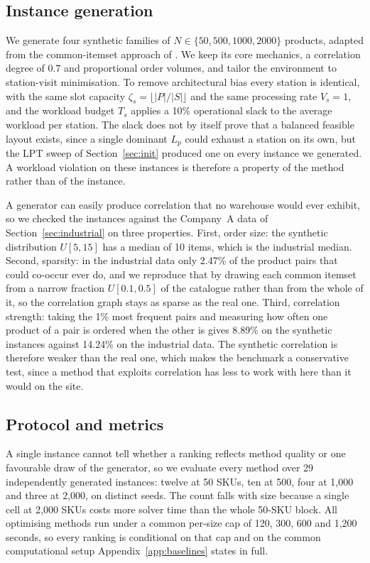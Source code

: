 \documentclass[]{interact}
\begin{document}
\subsection{Instance generation}
We generate four synthetic families of $N \in \{50, 500, 1000, 2000\}$ products, adapted from the common-itemset approach of \citet{zhang2019cie}. We keep its core mechanics, a correlation degree of $0.7$ and proportional order volumes, and tailor the environment to station-visit minimisation. To remove architectural bias every station is identical, with the same slot capacity $\zeta_s = \lfloor |P|/|S| \rfloor$ and the same processing rate $V_s = 1$, and the workload budget $T_s$ applies a 10\% operational slack to the average workload per station. The slack does not by itself prove that a balanced feasible layout exists, since a single dominant $L_p$ could exhaust a station on its own, but the LPT sweep of Section~\ref{sec:init} produced one on every instance we generated. A workload violation on these instances is therefore a property of the method rather than of the instance.

A generator can easily produce correlation that no warehouse would ever exhibit, so we checked the instances against the Company~A data of Section~\ref{sec:industrial} on three properties. First, order size: the synthetic distribution $U[5,15]$ has a median of 10 items, which is the industrial median. Second, sparsity: in the industrial data only 2.47\% of the product pairs that could co-occur ever do, and we reproduce that by drawing each common itemset from a narrow fraction $U[0.1,0.5]$ of the catalogue rather than from the whole of it, so the correlation graph stays as sparse as the real one. Third, correlation strength: taking the 1\% most frequent pairs and measuring how often one product of a pair is ordered when the other is gives 8.89\% on the synthetic instances against 14.24\% on the industrial data. The synthetic correlation is therefore weaker than the real one, which makes the benchmark a conservative test, since a method that exploits correlation has less to work with here than it would on the site.

\subsection{Protocol and metrics}
A single instance cannot tell whether a ranking reflects method quality or one favourable draw of the generator, so we evaluate every method over 29 independently generated instances: twelve at 50 SKUs, ten at 500, four at 1,000 and three at 2,000, on distinct seeds. The count falls with size because a single cell at 2,000 SKUs costs more solver time than the whole 50-SKU block. All optimising methods run under a common per-size cap of 120, 300, 600 and 1,200 seconds, so every ranking is conditional on that cap and on the common computational setup Appendix~\ref{app:baselines} states in full.
\end{document}
